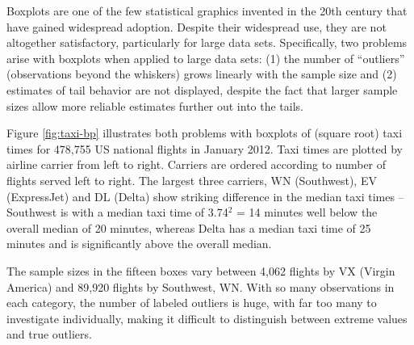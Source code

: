 \documentclass[12pt,oneside]{article}
\begin{document}
Boxplots are one of the few statistical graphics invented in the 20th century
that have gained widespread adoption. Despite their widespread use, they are
not altogether satisfactory, particularly for large data sets. Specifically,
two problems arise with boxplots when applied to large data sets: (1) the
number of ``outliers'' (observations beyond the whiskers) grows linearly with
the sample size and (2) estimates of tail behavior are not displayed, despite
the fact that larger sample sizes allow more reliable estimates further out
into the tails. 

Figure \ref{fig:taxi-bp} illustrates both problems with boxplots of (square root) taxi times for 478,755 US national flights in January 2012.  Taxi times are plotted by airline carrier from left to right. Carriers are ordered according to number of flights served left to right. The largest three carriers, WN (Southwest), EV (ExpressJet)  and DL (Delta) show striking difference in the median taxi times -- Southwest is with a median taxi time of 3.74$^2$ = 14 minutes well below the overall median of 20 minutes, whereas Delta has a median taxi time of 25 minutes and is significantly above the overall median.

The sample sizes in the fifteen boxes vary between 4,062 flights by VX (Virgin America) and 89,920 flights by Southwest, WN. 
With so many
observations in each category, the number of labeled outliers is huge, with
far too many to investigate individually, making it difficult to distinguish
between extreme values and true outliers.

%
%
\end{document}
